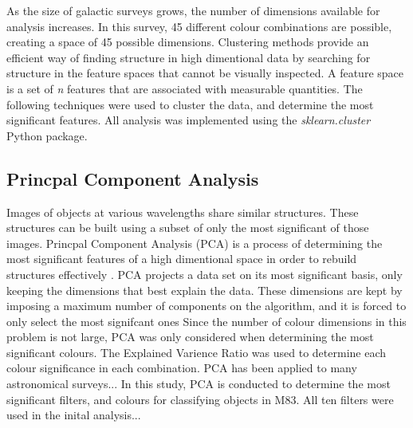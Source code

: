 As the size of galactic surveys grows, the number of dimensions available for analysis increases.
In this survey, 45 different colour combinations are possible, creating a space of 45 possible dimensions. 
Clustering methods provide an efficient way of finding structure in high dimentional data by searching for structure in the feature spaces that cannot be visually inspected. 
A feature space is a set of \textit{n} features that are associated with measurable quantities.
The following techniques were used to cluster the data, and determine the most significant features. 
All analysis was implemented using the \textit{sklearn.cluster} Python package. %

\subsection{Princpal Component Analysis}
Images of objects at various wavelengths share similar structures. These structures can be built using a subset of only the most significant of those images.  
Princpal Component Analysis (PCA) is a process of determining the most significant features of a high dimentional space in order to rebuild structures effectively \citet{kuntzer16}.
PCA projects a data set on its most significant basis, only keeping the dimensions that best explain the data. 
These dimensions are kept by imposing a maximum number of components on the algorithm, and it is forced to only select the most signifcant ones \citet{kuntzer16}
Since the number of colour dimensions in this problem is not large, PCA was only considered when determining the most significant colours. 
The Explained Varience Ratio was used to determine each colour significance in each combination. %
PCA has been applied to many astronomical surveys... %
In this study, PCA is conducted to determine the most significant filters, and colours for classifying objects in M83.
All ten filters were used in the inital analysis... %

